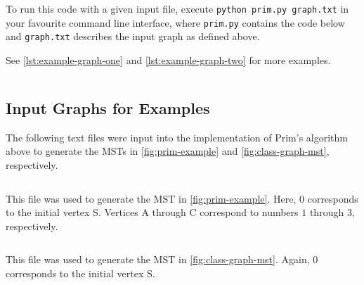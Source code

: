 \documentclass[a4paper,11pt]{report}
\theoremstyle{plain}
\theoremstyle{definition}
\begin{document}
To run this code with a given input file, execute \texttt{python prim.py
graph.txt} in your favourite command line interface, where \texttt{prim.py}
contains the code below and \texttt{graph.txt} describes the input graph as
defined above.

See \autoref{lst:example-graph-one} and \autoref{lst:example-graph-two} for
more examples.

\inputminted[frame=lines,framesep=1em,linenos]{python}{code/prim.py}

\subsection*{Input Graphs for Examples}

The following text files were input into the implementation of Prim's algorithm
above to generate the MSTs in \autoref{fig:prim-example} and
\autoref{fig:class-graph-mst}, respectively.

\begin{listing}[h]
\inputminted[frame=lines,framesep=1em,linenos]{text}{code/example-graph-one.txt}
\caption{This file was used to generate the MST in \autoref{fig:prim-example}.
Here, $0$ corresponds to the initial vertex S. Vertices A through C
correspond to numbers $1$ through $3$, respectively.}
\label{lst:example-graph-one}
\end{listing}

\begin{listing}[h]
\inputminted[frame=lines,framesep=1em,linenos]{text}{code/example-graph-two.txt}
\caption{This file was used to generate the MST in
\autoref{fig:class-graph-mst}. Again, $0$ corresponds to the initial vertex S.}
\label{lst:example-graph-two}
\end{listing}
\end{document}
